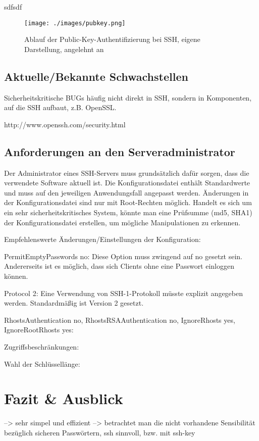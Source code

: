 \documentclass[ngerman,pdf]{wkcms}    %
\begin{document}
sdfsdf

\begin{figure}[!h] 
\centering 
\texttt{[image: ./images/pubkey.png]}
\label{fig:abb3} 
\caption[Abbildung 3]{Ablauf der Public-Key-Authentifizierung bei SSH, eigene Darstellung, angelehnt an \cite [S. 34]{SSH}} 
\end{figure}


\subsection{Aktuelle/Bekannte Schwachstellen}
Sicherheitskritische BUGs häufig nicht direkt in SSH, sondern in Komponenten, auf die SSH aufbaut, z.B. OpenSSL.

http://www.openssh.com/security.html

\subsection{Anforderungen an den Serveradministrator}

Der Administrator eines SSH-Servers muss grundsätzlich dafür sorgen, dass die verwendete Software aktuell ist. Die Konfigurationsdatei enthält Standardwerte und muss auf den jeweiligen Anwendungsfall angepasst werden.
Änderungen in der Konfigurationsdatei sind nur mit Root-Rechten möglich.
Handelt es sich um ein sehr sicherheitskritisches System, könnte man eine Prüfsumme (md5, SHA1) der Konfigurationsdatei erstellen, um mögliche Manipulationen zu erkennen. \cite[S. 50]{openssh_book}

Empfehlenswerte Änderungen/Einstellungen der Konfiguration:

\IT PermitEmptyPasswords no: Diese Option muss zwingend auf \IT no gesetzt sein. Andererseits ist es möglich, dass sich Clients ohne eine Passwort einloggen können.

\IT Protocol 2: Eine Verwendung von SSH-1-Protokoll müsste explizit angegeben werden. Standardmäßig ist Version 2 gesetzt.

\IT RhostsAuthentication no, RhostsRSAAuthentication no, IgnoreRhosts yes, IgnoreRootRhosts yes: 

Zugriffsbeschränkungen:

Wahl der Schlüssellänge:










\newpage


\section{Fazit \& Ausblick}
--> sehr simpel und effizient
--> betrachtet man die nicht vorhandene Sensibilität bezüglich sicheren Passwörtern, ssh sinnvoll, bzw. mit ssh-key




%
\end{document}
